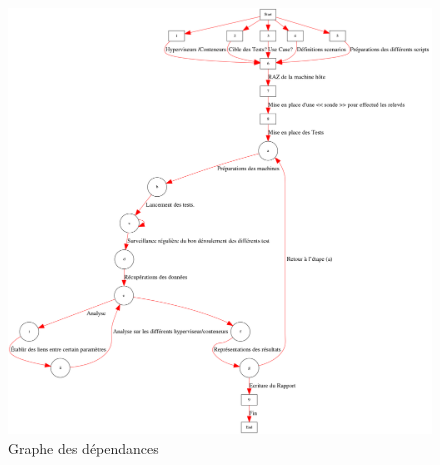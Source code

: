 \documentclass[french]{article}
\begin{document}
\begin{figure}
\centering
\caption{Graphe des dépendances }
\label{Graphe des dépendances }
\includegraphics[scale=0.250]{GrapheDepends.png}
\end{figure}
\end{document}

